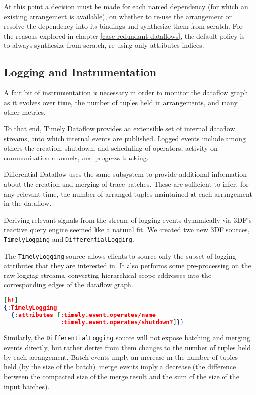\documentclass[../index.tex]{subfiles}
\begin{document}
At this point a decision must be made for each named dependency (for
which an existing arrangement is available), on whether to re-use the
arrangement or resolve the dependency into its bindings and synthesize
them from scratch. For the reasons explored in chapter
\ref{case-redundant-dataflows}, the default policy is to always
synthesize from scratch, re-using only attributes indices.

\subsection{Logging and Instrumentation} \label{logging}

A fair bit of instrumentation is necessary in order to monitor the
dataflow graph as it evolves over time, the number of tuples held in
arrangements, and many other metrics.

To that end, Timely Dataflow provides an extensible set of internal
dataflow streams, onto which internal events are published. Logged
events include among others the creation, shutdown, and scheduling of
operators, activity on communication channels, and progress tracking.

Differential Dataflow uses the same subsystem to provide additional
information about the creation and merging of trace batches. These are
sufficient to infer, for any relevant time, the number of arranged
tuples maintained at each arrangement in the dataflow.

Deriving relevant signals from the stream of logging events
dynamically via 3DF's reactive query engine seemed like a natural
fit. We created two new 3DF sources, \texttt{TimelyLogging} and
\texttt{DifferentialLogging}.

The \texttt{TimelyLogging} source allows clients to source only the
subset of logging attributes that they are interested in. It also
performs some pre-processing on the raw logging streams, converting
hierarchical scope addresses into the corresponding edges of the
dataflow graph.

\begin{lstlisting}[language=json][h!]
{:TimelyLogging
  {:attributes [:timely.event.operates/name
                :timely.event.operates/shutdown?]}}
\end{lstlisting}

Similarly, the \texttt{DifferentialLogging} source will not expose
batching and merging events directly, but rather derive from them
changes to the number of tuples held by each arrangement. Batch events
imply an increase in the number of tuples held (by the size of the
batch), merge events imply a decrease (the difference between the
compacted size of the merge result and the sum of the size of the
input batches).
\end{document}

